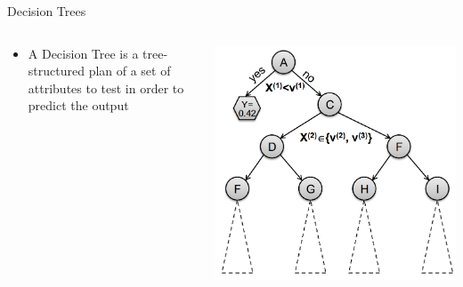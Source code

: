 \begin{frame}{Decision Trees}
    \begin{columns}
        \begin{column}{0.5\textwidth}
            \begin{itemize}
                \item A Decision Tree is a tree-structured plan of a set of attributes to test in order to predict the output
            \end{itemize}
        \end{column}
        \begin{column}{0.5\textwidth}
            \includegraphics[width=\linewidth]{images/decision-trees/decision-trees-3.png}
        \end{column}
    \end{columns}
\end{frame}


